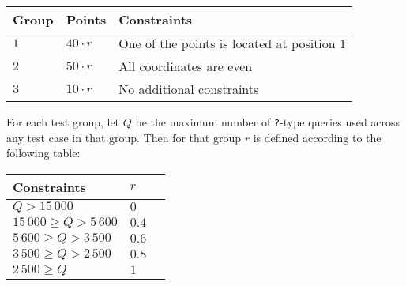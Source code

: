 \noindent
\begin{tabular}{| l | l | l |}
  \hline
  Group & Points       & Constraints \\ \hline
  $1$   & $40 \cdot r$ & One of the points is located at position $1$ \\ \hline
  $2$   & $50 \cdot r$ & All coordinates are even \\ \hline
  $3$   & $10 \cdot r$ & No additional constraints \\ \hline
\end{tabular}

For each test group, let $Q$ be the maximum number of \texttt{?}-type queries used across any test case in that group.
Then for that group $r$ is defined according to the following table:

\noindent
\begin{tabular}{| l | l | l |}
  \hline
  Constraints                & $r$ \\ \hline
  $             Q > 15\,000$ & $0$ \\ \hline
  $ 15\,000 \ge Q > 5\,600$  & $0.4$  \\ \hline
  $  5\,600 \ge Q > 3\,500$  & $0.6$  \\ \hline
  $  3\,500 \ge Q > 2\,500$  & $0.8$  \\ \hline
  $  2\,500 \ge Q$           & $1$  \\ \hline
\end{tabular}
